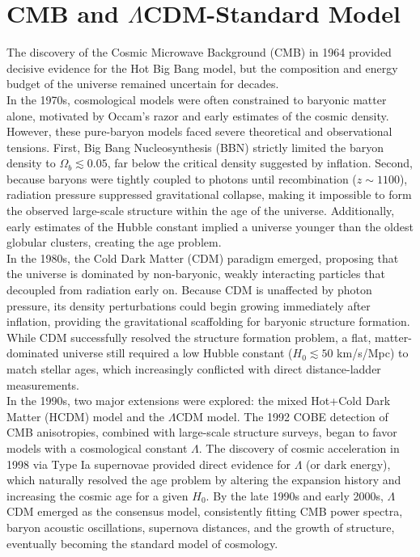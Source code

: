 \section{CMB and $\Lambda$CDM-Standard Model}
\begin{extra}
    The discovery of the Cosmic Microwave Background (CMB) in 1964 provided decisive evidence for the Hot Big Bang model, but the composition and energy budget of the universe remained uncertain for decades. \\

    In the 1970s, cosmological models were often constrained to baryonic matter alone, motivated by Occam's razor and early estimates of the cosmic density. However, these pure-baryon models faced severe theoretical and observational tensions. First, Big Bang Nucleosynthesis (BBN) strictly limited the baryon density to $\Omega_b \lesssim 0.05$, far below the critical density suggested by inflation. Second, because baryons were tightly coupled to photons until recombination ($z \sim 1100$), radiation pressure suppressed gravitational collapse, making it impossible to form the observed large-scale structure within the age of the universe. Additionally, early estimates of the Hubble constant implied a universe younger than the oldest globular clusters, creating the age problem. \\

    In the 1980s, the Cold Dark Matter (CDM) paradigm emerged, proposing that the universe is dominated by non-baryonic, weakly interacting particles that decoupled from radiation early on. Because CDM is unaffected by photon pressure, its density perturbations could begin growing immediately after inflation, providing the gravitational scaffolding for baryonic structure formation. While CDM successfully resolved the structure formation problem, a flat, matter-dominated universe still required a low Hubble constant ($H_0 \lesssim 50$ km/s/Mpc) to match stellar ages, which increasingly conflicted with direct distance-ladder measurements. \\

    In the 1990s, two major extensions were explored: the mixed Hot+Cold Dark Matter (HCDM) model and the $\Lambda$CDM model. The 1992 COBE detection of CMB anisotropies, combined with large-scale structure surveys, began to favor models with a cosmological constant $\Lambda$. The discovery of cosmic acceleration in 1998 via Type Ia supernovae provided direct evidence for $\Lambda$ (or dark energy), which naturally resolved the age problem by altering the expansion history and increasing the cosmic age for a given $H_0$. By the late 1990s and early 2000s, $\Lambda$CDM emerged as the consensus model, consistently fitting CMB power spectra, baryon acoustic oscillations, supernova distances, and the growth of structure, eventually becoming the standard model of cosmology.
\end{extra}

